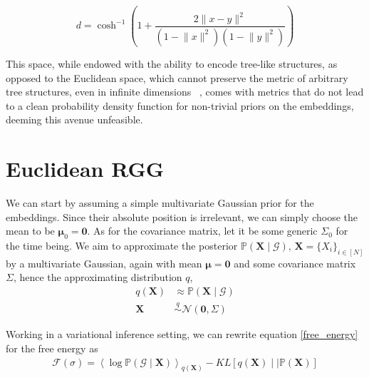 \documentclass[12pt]{report}
\newcommand{\bs}{\boldsymbol}
\newcommand{\mc}[1]{\mathcal{#1}}
\newcommand{\mb}[1]{\mathbb{#1}}
\renewcommand{\bs}{\boldsymbol}
\begin{document}
\begin{equation}
    d = \cosh^{-1}\left(1 + \frac{2\lVert x - y \rVert^2}{(1 - \lVert x \rVert^2)(1 - \lVert y \rVert^2)}\right)
\end{equation}

This space, while endowed with the ability to encode tree-like structures, as opposed to the Euclidean space, which cannot preserve the metric of arbitrary tree structures, even in infinite dimensions ~\parencite{representation}, comes with metrics that do not lead to a clean probability density function for non-trivial priors on the embeddings, deeming this avenue unfeasible.

\section{Euclidean RGG}
We can start by assuming a simple multivariate Gaussian prior for the embeddings. Since their absolute position is irrelevant, we can simply choose the mean to be $\bs{\mu}_0 = \bs{0}$. As for the covariance matrix, let it be some generic $\Sigma_0$ for the time being. We aim to approximate the posterior $\mb{P}(\bs{X} \mid \mc{G}),\, \bs{X} = \{X_i\}_{i \in [N]}$ by a multivariate Gaussian, again with mean $\bs{\mu} = \bs{0}$ and some covariance matrix $\Sigma$, hence the approximating distribution $q$,
\begin{align*}
    q(\bs{X}) &\approx \mb{P}(\bs{X} \mid \mc{G}) \\
    \bs{X} &\overset{q}{\sim} \mc{N}(\bs{0}, \Sigma)
\end{align*}

Working in a variational inference setting, we can rewrite equation \ref{free_energy} for the free energy as
\begin{align*}
    \mc{F}(\sigma) = \left<\log\mb{P}(\mc{G} \mid \bs{X})\right>_{q(\bs{X})} - KL[q(\bs{X}) \mid\mid \mb{P}(\bs{X})]
\end{align*}
\end{document}
